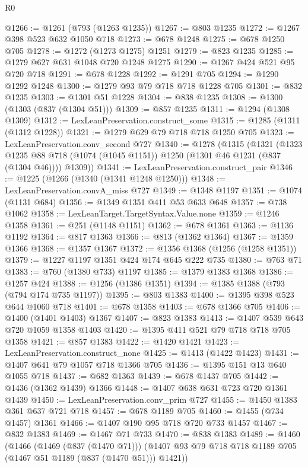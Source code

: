 \begin{lexlean}{R0}
\begin{coremodule}
{{{{{{{{{{{{{{{{{{{{{{{{{{{{{{{{@1266 := @1261 (@793 (@1263 @1235))
@1267 := @803 @1235
@1272 := @1267 @398 @523 @632 @1050 @718
@1273 := @678 @1248
@1275 := @678 @1250 @705
@1278 := @1272 (@1273 @1275) @1251
@1279 := @823 @1235
@1285 := @1279 @627 @631 @1048 @720 @1248 @1275
@1290 := @1267 @424 @521 @95 @720 @718
@1291 := @678 @1228
@1292 := @1291 @705
@1294 := @1290 @1292 @1248
@1300 := @1279 @93 @79 @718 @718 @1228 @705
@1301 := @832 @1235
@1303 := @1301 @51 @1228
@1304 := @838 @1235
@1308 := @1300 (@1303 (@837 (@1304 @51)))
@1309 := @857 @1235
@1311 := @1294 (@1308 @1309)
@1312 := LexLeanPreservation.construct_some
@1315 := @1285 (@1311 (@1312 @1228))
@1321 := @1279 @629 @79 @718 @718 @1250 @705
@1323 := LexLeanPreservation.conv_second @727
@1340 := @1278
    (@1315
      (@1321
        (@1323 @1235 @88 @718 (@1074 (@1045 @1151)) @1250 (@1301 @46 @1231 (@837 (@1304 @46))))
        @1309))
@1341 := LexLeanPreservation.construct_pair
@1346 := @1225 (@1266 (@1340 (@1341 @1248 @1250)))
@1348 := LexLeanPreservation.convA_miss @727
@1349 := @1348 @1197
@1351 := @1074 (@1131 @684)
@1356 := @1349 @1351 @411 @53 @633 @648
@1357 := @738 @1062
@1358 := LexLeanTarget.TargetSyntax.Value.none
@1359 := @1246 @1358
@1361 := @251 (@1148 @1151)
@1362 := @678 @1361
@1363 := @1136 @1192
@1364 := @817 @1363
@1366 := @813 (@1362 @1364)
@1367 := @1359 @1366
@1368 := @1357 @1367
@1372 := @1356 @1368 (@1256 (@1258 @1351))
@1379 := @1227 @1197 @1351 @424 @174 @645 @222 @735
@1380 := @763 @71
@1383 := @760 (@1380 @733) @1197
@1385 := @1379 @1383 @1368
@1386 := @1257 @424
@1388 := @1256 (@1386 @1351)
@1394 := @1385 @1388 (@793 (@794 @174 @735 @1197))
@1395 := @803 @1383
@1400 := @1395 @398 @523 @644 @1060 @718
@1401 := @678 @1358
@1403 := @678 @1366 @705
@1406 := @1400 (@1401 @1403) @1367
@1407 := @823 @1383
@1413 := @1407 @539 @643 @720 @1059 @1358 @1403
@1420 := @1395 @411 @521 @79 @718 @718 @705 @1358
@1421 := @857 @1383
@1422 := @1420 @1421
@1423 := LexLeanPreservation.construct_none
@1425 := @1413 (@1422 @1423)
@1431 := @1407 @641 @79 @1057 @718 @1366 @705
@1436 := @1395 @151 @13 @640 @1055 @718
@1437 := @682 @1363
@1439 := @678 @1437 @705
@1442 := @1436 (@1362 @1439) @1366
@1448 := @1407 @638 @631 @723 @720 @1361 @1439
@1450 := LexLeanPreservation.conv_prim @727
@1455 := @1450 @1383 @361 @637 @721 @718
@1457 := @678 @1189 @705
@1460 := @1455 (@734 @1457) @1361
@1466 := @1407 @190 @95 @718 @720 @733 @1457
@1467 := @832 @1383
@1469 := @1467 @71 @733
@1470 := @838 @1383
@1489 := @1460
    (@1466
      (@1469 (@837 (@1470 @71)))
      (@1407 @93 @79 @718 @718 @1189 @705 (@1467 @51 @1189 (@837 (@1470 @51))) @1421))
}}}}}}}}}}}}}}}}}}}}}}}}}}}}}}}}
\end{coremodule}
\end{lexlean}
